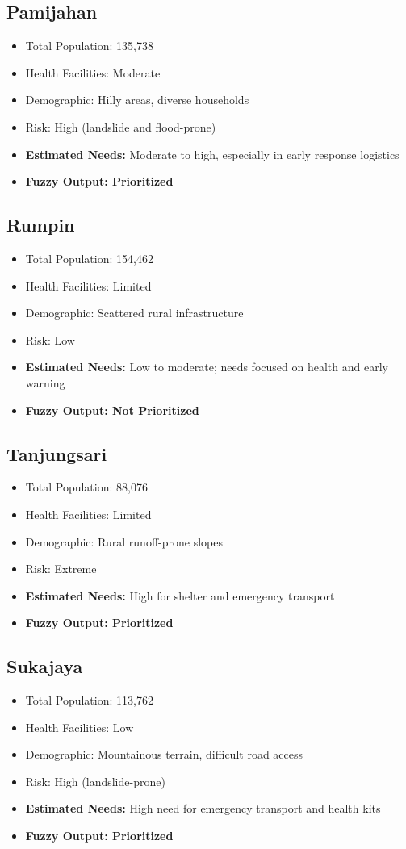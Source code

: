 \documentclass[conference,final,a4paper,twoside,10pt]{IEEEtran}
\begin{document}
\subsection*{Pamijahan}
\begin{itemize}
    \item Total Population: 135,738
    \item Health Facilities: Moderate
    \item Demographic: Hilly areas, diverse households
    \item Risk: High (landslide and flood-prone)
    \item \textbf{Estimated Needs:} Moderate to high, especially in early response logistics
    \item \textbf{Fuzzy Output: Prioritized}
\end{itemize}
\subsection*{Rumpin}
\begin{itemize}
    \item Total Population: 154,462
    \item Health Facilities: Limited
    \item Demographic: Scattered rural infrastructure
    \item Risk: Low
    \item \textbf{Estimated Needs:} Low to moderate; needs focused on health and early warning
    \item \textbf{Fuzzy Output: Not Prioritized}
\end{itemize}
\subsection*{Tanjungsari}
\begin{itemize}
    \item Total Population: 88,076
    \item Health Facilities: Limited
    \item Demographic: Rural runoff-prone slopes
    \item Risk: Extreme
    \item \textbf{Estimated Needs:} High for shelter and emergency transport
    \item \textbf{Fuzzy Output: Prioritized}
\end{itemize}
\subsection*{Sukajaya}
\begin{itemize}
    \item Total Population: 113,762
    \item Health Facilities: Low
    \item Demographic: Mountainous terrain, difficult road access
    \item Risk: High (landslide-prone)
    \item \textbf{Estimated Needs:} High need for emergency transport and health kits
    \item \textbf{Fuzzy Output: Prioritized}
\end{itemize}
\end{document}
